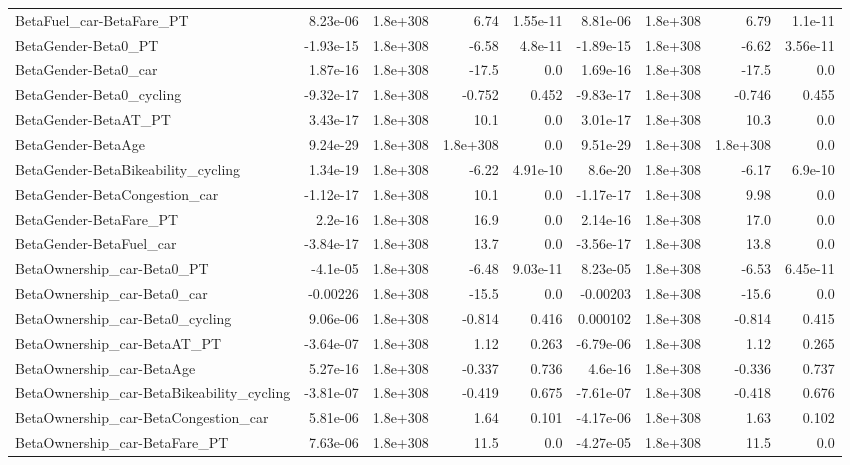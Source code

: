 \begin{tabular}{lrrrrrrrr}
BetaFuel_car-BetaFare_PT & 8.23e-06 & 1.8e+308 & 6.74 & 1.55e-11 & 8.81e-06 & 1.8e+308 & 6.79 & 1.1e-11 \\
BetaGender-Beta0_PT & -1.93e-15 & 1.8e+308 & -6.58 & 4.8e-11 & -1.89e-15 & 1.8e+308 & -6.62 & 3.56e-11 \\
BetaGender-Beta0_car & 1.87e-16 & 1.8e+308 & -17.5 & 0.0 & 1.69e-16 & 1.8e+308 & -17.5 & 0.0 \\
BetaGender-Beta0_cycling & -9.32e-17 & 1.8e+308 & -0.752 & 0.452 & -9.83e-17 & 1.8e+308 & -0.746 & 0.455 \\
BetaGender-BetaAT_PT & 3.43e-17 & 1.8e+308 & 10.1 & 0.0 & 3.01e-17 & 1.8e+308 & 10.3 & 0.0 \\
BetaGender-BetaAge & 9.24e-29 & 1.8e+308 & 1.8e+308 & 0.0 & 9.51e-29 & 1.8e+308 & 1.8e+308 & 0.0 \\
BetaGender-BetaBikeability_cycling & 1.34e-19 & 1.8e+308 & -6.22 & 4.91e-10 & 8.6e-20 & 1.8e+308 & -6.17 & 6.9e-10 \\
BetaGender-BetaCongestion_car & -1.12e-17 & 1.8e+308 & 10.1 & 0.0 & -1.17e-17 & 1.8e+308 & 9.98 & 0.0 \\
BetaGender-BetaFare_PT & 2.2e-16 & 1.8e+308 & 16.9 & 0.0 & 2.14e-16 & 1.8e+308 & 17.0 & 0.0 \\
BetaGender-BetaFuel_car & -3.84e-17 & 1.8e+308 & 13.7 & 0.0 & -3.56e-17 & 1.8e+308 & 13.8 & 0.0 \\
BetaOwnership_car-Beta0_PT & -4.1e-05 & 1.8e+308 & -6.48 & 9.03e-11 & 8.23e-05 & 1.8e+308 & -6.53 & 6.45e-11 \\
BetaOwnership_car-Beta0_car & -0.00226 & 1.8e+308 & -15.5 & 0.0 & -0.00203 & 1.8e+308 & -15.6 & 0.0 \\
BetaOwnership_car-Beta0_cycling & 9.06e-06 & 1.8e+308 & -0.814 & 0.416 & 0.000102 & 1.8e+308 & -0.814 & 0.415 \\
BetaOwnership_car-BetaAT_PT & -3.64e-07 & 1.8e+308 & 1.12 & 0.263 & -6.79e-06 & 1.8e+308 & 1.12 & 0.265 \\
BetaOwnership_car-BetaAge & 5.27e-16 & 1.8e+308 & -0.337 & 0.736 & 4.6e-16 & 1.8e+308 & -0.336 & 0.737 \\
BetaOwnership_car-BetaBikeability_cycling & -3.81e-07 & 1.8e+308 & -0.419 & 0.675 & -7.61e-07 & 1.8e+308 & -0.418 & 0.676 \\
BetaOwnership_car-BetaCongestion_car & 5.81e-06 & 1.8e+308 & 1.64 & 0.101 & -4.17e-06 & 1.8e+308 & 1.63 & 0.102 \\
BetaOwnership_car-BetaFare_PT & 7.63e-06 & 1.8e+308 & 11.5 & 0.0 & -4.27e-05 & 1.8e+308 & 11.5 & 0.0 \\

\end{tabular}
